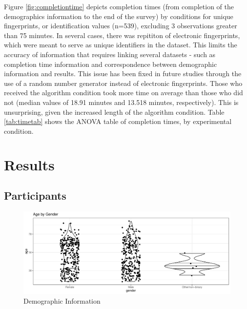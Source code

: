 \documentclass[print]{nuthesis}
\begin{document}
Figure \ref{fig:completiontime} depicts completion times (from completion of the demographics information to the end of the survey) by conditions for unique fingerprints, or identification values (n=539), excluding 3 observations greater than 75 minutes.
In several cases, there was repititon of electronic fingerprints, which were meant to serve as unique identifiers in the dataset.
This limits the accuracy of information that requires linking several datasets - such as completion time information and correspondence between demographic information and results.
This issue has been fixed in future studies through the use of a random number generator instead of electronic fingerprints.
Those who received the algorithm condition took more time on average than those who did not (median values of 18.91 minutes and 13.518 minutes, respectively).
This is unsurprising, given the increased length of the algorithm condition.
Table \ref{tab:timetab} shows the ANOVA table of completion times, by experimental condition.

\hypertarget{results}{%
\section{Results}\label{results}}

\hypertarget{participants}{%
\subsection{Participants}\label{participants}}

\begin{figure}

{\centering \includegraphics[width=\linewidth]{thesis_files/figure-latex/demographics-1} 

}

\caption{Demographic Information}\label{fig:demographics}
\end{figure}
\end{document}
